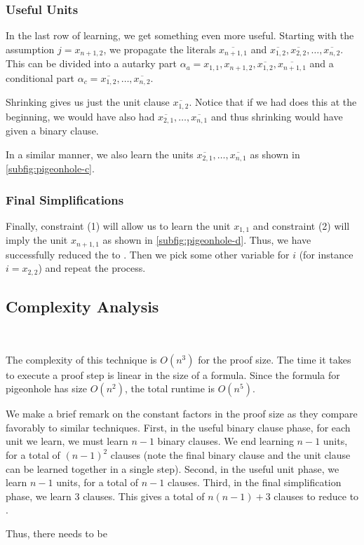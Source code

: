 \subsubsection{Useful Units} In the last row of learning, we get something even more useful. Starting with the assumption $j = x_{n+1, 2}$, we propagate the literals $\overline{x_{n + 1, 1}}$ and $\overline{x_{1, 2}}, \overline{x_{2, 2}}, \ldots, \overline{x_{n, 2}}$.  This can be divided into a autarky part $\alpha_a = x_{1, 1}, x_{n+1, 2}, \overline{x_{1, 2}}, \overline{x_{n+1, 1}}$ and a conditional part $\alpha_c = \overline{x_{1, 2}}, \ldots, \overline{x_{n, 2}}$.

Shrinking gives us just the unit clause $\overline{x_{1, 2}}$. Notice that if we had does this at the beginning, we would have also had $\overline{x_{2, 1}}, \ldots, \overline{x_{n, 1}}$ and thus shrinking would have given a binary clause.

In a similar manner, we also learn the units $\overline{x_{2, 1}}, \ldots, \overline{x_{n, 1}}$ as shown in \autoref{subfig:pigeonhole-c}.

\subsubsection{Final Simplifications} Finally, constraint (1) will allow us to learn the unit $x_{1, 1}$ and constraint (2) will imply the unit $x_{n+1, 1}$ as shown in \autoref{subfig:pigeonhole-d}. Thus, we have successfully reduced the  to . Then we pick some other variable for $i$ (for instance $i = x_{2, 2}$) and repeat the process.

\subsection{Complexity Analysis}~\label{subsec:complexity analysis}

The complexity of this technique is $O(n^3)$ for the proof size. The time it takes to execute a proof step is linear in the size of a formula. Since the formula for pigeonhole has size $O(n^2)$, the total runtime is $O(n^5)$.

We make a brief remark on the constant factors in the proof size as they compare favorably to similar techniques. First, in the useful binary clause phase, for each unit we learn, we must learn $n-1$ binary clauses. We end learning $n-1$ units, for a total of $(n-1)^2$ clauses (note the final binary clause and the unit clause can be learned together in a single step). Second, in the useful unit phase, we learn $n-1$ units, for a total of $n-1$ clauses. Third, in the final simplification phase, we learn 3 clauses. This gives a total of $n(n-1) + 3$ clauses to reduce  to .

Thus, there needs to be 